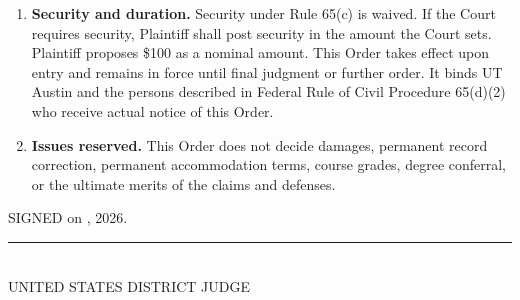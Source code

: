 \documentclass[12pt]{article}
\begin{document}
\begin{enumerate}
\item \textbf{Security and duration.} Security under Rule 65(c) is waived. If the Court requires security, Plaintiff shall post security in the amount the Court sets. Plaintiff proposes \$100 as a nominal amount. This Order takes effect upon entry and remains in force until final judgment or further order. It binds UT Austin and the persons described in Federal Rule of Civil Procedure 65(d)(2) who receive actual notice of this Order.

\item \textbf{Issues reserved.} This Order does not decide damages, permanent record correction, permanent accommodation terms, course grades, degree conferral, or the ultimate merits of the claims and defenses.
\end{enumerate}

SIGNED on \underline{\hspace{1.4in}}, 2026.

\vspace{2.2em}
\noindent\rule{3.5in}{0.4pt}\\
UNITED STATES DISTRICT JUDGE
\end{document}
